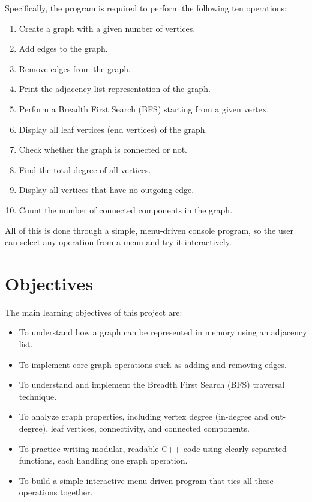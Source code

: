 \documentclass[11pt]{article}
\begin{document}
Specifically, the program is required to perform the following ten operations:

\begin{enumerate}[topsep=2pt, itemsep=2pt]
  \item Create a graph with a given number of vertices.
  \item Add edges to the graph.
  \item Remove edges from the graph.
  \item Print the adjacency list representation of the graph.
  \item Perform a Breadth First Search (BFS) starting from a given vertex.
  \item Display all leaf vertices (end vertices) of the graph.
  \item Check whether the graph is connected or not.
  \item Find the total degree of all vertices.
  \item Display all vertices that have no outgoing edge.
  \item Count the number of connected components in the graph.
\end{enumerate}

All of this is done through a simple, menu-driven console program, so the user can select any operation from a menu and try it interactively.

\section{Objectives}

The main learning objectives of this project are:

\begin{itemize}[topsep=2pt, itemsep=2pt]
  \item To understand how a graph can be represented in memory using an adjacency list.
  \item To implement core graph operations such as adding and removing edges.
  \item To understand and implement the Breadth First Search (BFS) traversal technique.
  \item To analyze graph properties, including vertex degree (in-degree and out-degree), leaf vertices, connectivity, and connected components.
  \item To practice writing modular, readable C++ code using clearly separated functions, each handling one graph operation.
  \item To build a simple interactive menu-driven program that ties all these operations together.
\end{itemize}
\end{document}
